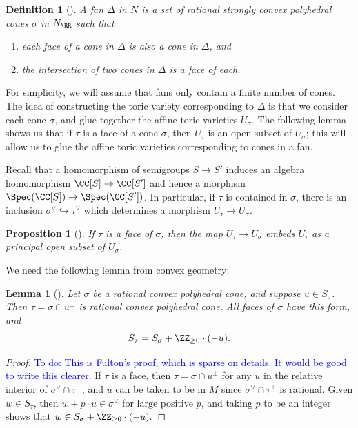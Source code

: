 \documentclass[12pt]{amsart}
\newcommand{\todo}[1]{\noindent  \textcolor{blue}{To do: #1}}
\theoremstyle{plain}
\newtheorem{definition}[theorem]{Definition}
\newtheorem{lemma}[theorem]{Lemma}
\newtheorem{proposition}[theorem]{Proposition}
\begin{document}
\begin{definition}[{\cite[\S 1.4]{Fulton93}}]
A fan $\Delta$ in $N$ is a set of rational strongly convex polyhedral cones $\sigma$ in $N_\RR$ such that
\begin{enumerate}
\item
each face of a cone in $\Delta$ is also a cone in $\Delta$, and
\item
the intersection of two cones in $\Delta$ is a face of each.
\end{enumerate}
\end{definition}

For simplicity, we will assume that fans only contain a finite number of cones.
The idea of constructing the toric variety corresponding to $\Delta$ is that we consider each cone $\sigma$, and glue together the affine toric varieties $U_\sigma$.
The following lemma shows us that if $\tau$ is a face of a cone $\sigma$, then $U_\tau$ is an open subset of $U_\sigma$;
this will allow us to glue the affine toric varieties corresponding to cones in a fan.

Recall that a homomorphism of semigroups $S \to S'$ induces an algebra homomorphism $\CC[S] \to \CC[S']$ and hence a morphism $\Spec(\CC[S]) \to \Spec(\CC[S'])$.
In particular, if $\tau$ is contained in $\sigma$, there is an inclusion $\sigma^\vee \hookrightarrow \tau^\vee$ which determines a morphism $U_\tau \to U_\sigma$.

\begin{proposition}[{\cite[\S 1.3]{Fulton93}}]\label{faceembedding}
If $\tau$ is a face of $\sigma$, then the map $U_\tau \to U_\sigma$ embeds $U_\tau$ as a principal open subset of $U_\sigma$.
\end{proposition}

We need the following lemma from convex geometry:

\begin{lemma}[{\cite[\S 1.2]{Fulton93}}]
Let $\sigma$ be a rational convex polyhedral cone, and suppose $u \in S_\sigma$.
Then $\tau = \sigma \cap u^\perp$ is rational convex polyhedral cone. 
All faces of $\sigma$ have this form, and
$$S_\tau = S_\sigma + \ZZ_{\ge 0} \cdot (-u).$$
\end{lemma}
\begin{proof}
\todo{This is Fulton's proof, which is sparse on details. It would be good to write this clearer.}
If $\tau$ is a face, then $\tau = \sigma \cap u^\perp$ for any $u$ in the relative interior of $\sigma^\vee \cap \tau^\perp$, and $u$ can be taken to be in $M$ since $\sigma^\vee \cap \tau^\perp$ is rational.
Given $w\in S_\tau$, then $w + p \cdot u \in \sigma^\vee$ for large positive $p$, and taking $p$ to be an integer shows that $w \in S_\sigma + \ZZ_{\ge 0} \cdot (-u).$
\end{proof}
\end{document}
